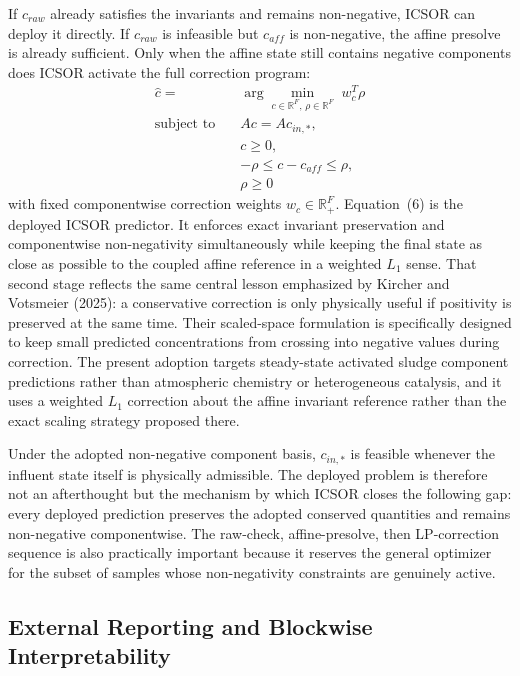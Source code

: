 \documentclass[11pt]{article}
\begin{document}
If $c_{raw}$ already satisfies the invariants and remains non-negative, ICSOR can deploy it directly. If $c_{raw}$ is infeasible but $c_{aff}$ is non-negative, the affine presolve is already sufficient. Only when the affine state still contains negative components does ICSOR activate the full correction program:
\begin{equation}
\begin{aligned}
\hat{c} = {}& \arg\min_{c \in \mathbb{R}^{F},\, \rho \in \mathbb{R}^{F}} \; w_c^T \rho \\
\text{subject to} \quad {}& A c = A c_{in,*}, \\
& c \ge 0, \\
& -\rho \le c - c_{aff} \le \rho, \\
& \rho \ge 0
\end{aligned}
\end{equation}
with fixed componentwise correction weights $w_c \in \mathbb{R}_{+}^{F}$. Equation~(6) is the deployed ICSOR predictor. It enforces exact invariant preservation and componentwise non-negativity simultaneously while keeping the final state as close as possible to the coupled affine reference in a weighted $L_1$ sense.
That second stage reflects the same central lesson emphasized by Kircher and Votsmeier (2025): a conservative correction is only physically useful if positivity is preserved at the same time. Their scaled-space formulation is specifically designed to keep small predicted concentrations from crossing into negative values during correction. The present adoption targets steady-state activated sludge component predictions rather than atmospheric chemistry or heterogeneous catalysis, and it uses a weighted $L_1$ correction about the affine invariant reference rather than the exact scaling strategy proposed there.

Under the adopted non-negative component basis, $c_{in,*}$ is feasible whenever the influent state itself is physically admissible. The deployed problem is therefore not an afterthought but the mechanism by which ICSOR closes the following gap: every deployed prediction preserves the adopted conserved quantities and remains non-negative componentwise. The raw-check, affine-presolve, then LP-correction sequence is also practically important because it reserves the general optimizer for the subset of samples whose non-negativity constraints are genuinely active.

\subsection{External Reporting and Blockwise Interpretability}
\end{document}
